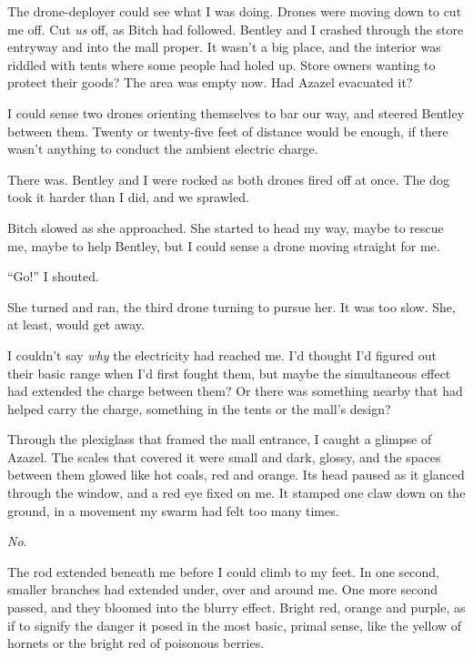 The drone-deployer could see what I was doing.  Drones were moving down to cut me off.  Cut \emph{us} off, as Bitch had followed.  Bentley and I crashed through the store entryway and into the mall proper.  It wasn't a big place, and the interior was riddled with tents where some people had holed up.  Store owners wanting to protect their goods?  The area was empty now.  Had Azazel evacuated it?



I could sense two drones orienting themselves to bar our way, and steered Bentley between them.  Twenty or twenty-five feet of distance would be enough, if there wasn't anything to conduct the ambient electric charge.



There was.  Bentley and I were rocked as both drones fired off at once.  The dog took it harder than I did, and we sprawled.



Bitch slowed as she approached.  She started to head my way, maybe to rescue me, maybe to help Bentley, but I could sense a drone moving straight for me.



``Go!''  I shouted.



She turned and ran, the third drone turning to pursue her.  It was too slow.  She, at least, would get away.



I couldn't say \emph{why} the electricity had reached me.  I'd thought I'd figured out their basic range when I'd first fought them, but maybe the simultaneous effect had extended the charge between them?  Or there was something nearby that had helped carry the charge, something in the tents or the mall's design?



Through the plexiglass that framed the mall entrance, I caught a glimpse of Azazel.  The scales that covered it were small and dark, glossy, and the spaces between them glowed like hot coals, red and orange.  Its head paused as it glanced through the window, and a red eye fixed on me.  It stamped one claw down on the ground, in a movement my swarm had felt too many times.



\emph{No}.



The rod extended beneath me before I could climb to my feet.  In one second, smaller branches had extended under, over and around me.  One more second passed, and they bloomed into the blurry effect.  Bright red, orange and purple, as if to signify the danger it posed in the most basic, primal sense, like the yellow of hornets or the bright red of poisonous berries.



